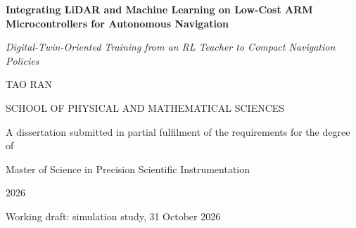 \documentclass[12pt,a4paper,oneside]{report}
\newcommand{\DissertationTitle}{Integrating LiDAR and Machine Learning on Low-Cost ARM Microcontrollers for Autonomous Navigation}
\newcommand{\AuthorName}{TAO RAN}
\newcommand{\ProgrammeName}{Master of Science in Precision Scientific Instrumentation}
\newcommand{\SubmissionYear}{2026}
\begin{document}
\hypersetup{pageanchor=false}

\begin{titlepage}
  \centering
  \vspace*{1.5cm}
  {\Large\bfseries \DissertationTitle\par}
  \vspace{0.6cm}
  {\normalsize\itshape Digital-Twin-Oriented Training from an RL Teacher to Compact Navigation Policies\par}
  \vspace{1.4cm}
  {\large \AuthorName\par}
  \vfill
  {\normalsize SCHOOL OF PHYSICAL AND MATHEMATICAL SCIENCES\par}
  \vspace{1cm}
  {\normalsize A dissertation submitted in partial fulfilment of the requirements
  for the degree of\par}
  \vspace{0.4cm}
  {\normalsize \ProgrammeName\par}
  \vspace{1.2cm}
  {\large \SubmissionYear\par}
  \vspace{0.5cm}
  {\small Working draft: simulation study, 31 October 2026\par}
\end{titlepage}

\hypersetup{pageanchor=true}
\tableofcontents
\clearpage

\clearpage
{}
{}
\listoffigures
\clearpage
{}
{}
\listoftables
\clearpage
{}









\clearpage
{}
{}



\clearpage
\appendix

\end{document}
